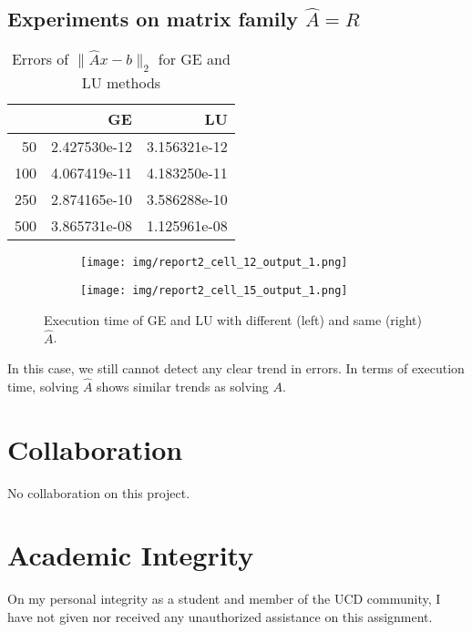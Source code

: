\documentclass[a4paper,12pt]{article}
\begin{document}
\subsection{Experiments on matrix family $\hat{A} = R$}

\begin{table}[H]
\begin{center}	
	\begin{tabular}{rrr}
	\toprule
	{ } &           GE &           LU \\
	\midrule
	 50 & 2.427530e-12 & 3.156321e-12 \\
	100 & 4.067419e-11 & 4.183250e-11 \\
	250 & 2.874165e-10 & 3.586288e-10 \\
	500 & 3.865731e-08 & 1.125961e-08 \\
	\bottomrule
	\end{tabular}
	\caption{Errors of $\| \hat{A}x - b\|_{2}$ for GE and LU methods}
\end{center}
\end{table}

\begin{figure}[H]
    \centering
	\begin{subfigure}[b]{0.49\textwidth}
	    \centering
	    \texttt{[image: img/report2\_cell\_12\_output\_1.png]}
	    \label{fig:2}
	\end{subfigure}
	\hfill
	\begin{subfigure}[b]{0.49\textwidth}
	    \centering
	     \texttt{[image: img/report2\_cell\_15\_output\_1.png]}
	     \label{fig:3}
	\end{subfigure}
	\caption{Execution time of GE and LU with different (left) and same (right) $\hat{A}$.}
\end{figure}

In this case, we still cannot detect any clear trend in errors.
In terms of execution time,
solving $\hat{A}$ shows similar trends as solving $A$.

\section{Collaboration}
No collaboration on this project.


\section{Academic Integrity}
On my personal integrity as a student and member of the UCD community, I have not given nor received any unauthorized assistance on this assignment.
\end{document}

